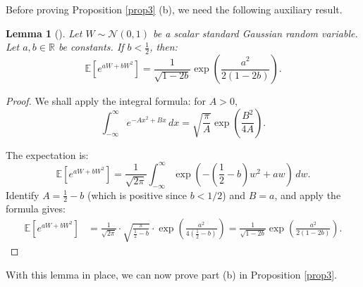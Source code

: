 \documentclass[a4paper,11pt]{article}
\theoremstyle{plain}
\newtheorem{lemmainner}[theoreminner]{Lemma}
\theoremstyle{definition}
\newenvironment{lemma}[1][]
  {\begin{mdframed}[style=lemmastyle]\begin{lemmainner}[#1]}
  {\end{lemmainner}\end{mdframed}}
\begin{document}
Before proving Proposition \ref{prop3} (b), we need the following auxiliary result. 
\begin{lemma} \label{lem_1}
    Let $W \sim \mathcal{N}(0, 1)$ be a scalar standard Gaussian random variable. Let $a, b \in \mathbb{R}$ be constants. If $b < \frac{1}{2}$, then:
    $$\mathbb{E}\left[e^{a W + bW^2}\right] = \frac{1}{\sqrt{1 - 2b}} \exp\left( \frac{a^2}{2(1 - 2b)} \right).$$
\end{lemma}
\begin{proof}
    We shall apply the integral formula: for $A > 0$, 
    $$\int_{-\infty}^{\infty} e^{-Ax^2 + Bx} \, dx = \sqrt{\frac{\pi}{A}} \exp\left(\frac{B^2}{4A}\right).$$
    
    The expectation is:
    $$\mathbb{E}[e^{aW + bW^2}] = \frac{1}{\sqrt{2\pi}} \int_{-\infty}^{\infty} \exp\left( -\left(\frac{1}{2} - b\right)w^2 + aw \right) \, dw.$$
    Identify $A = \frac{1}{2} - b$ (which is positive since $b < 1/2$) and $B = a$, and apply the formula  gives: 
    $$\begin{aligned}
\mathbb{E}\left[e^{a W + bW^2}\right] &= \frac{1}{\sqrt{2\pi}} \cdot \sqrt{\frac{\pi}{\frac{1}{2} - b}} \cdot \exp\left( \frac{a^2}{4(\frac{1}{2} - b)} \right) = \frac{1}{\sqrt{1 - 2b}} \exp\left( \frac{a^2}{2(1 - 2b)} \right).
\end{aligned}$$
\end{proof}


With this lemma in place, we can now prove part (b) in Proposition \ref{prop3}.  
\end{document}
